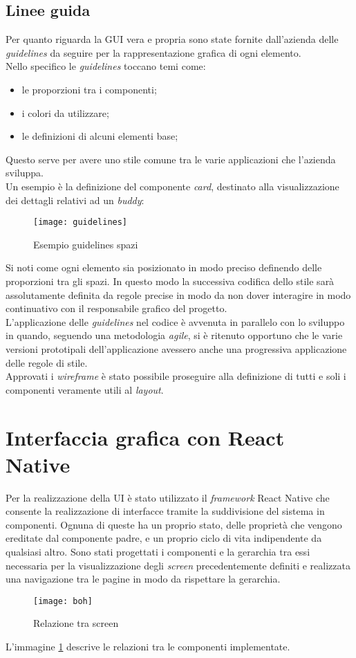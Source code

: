 \subsection{Linee guida}
Per quanto riguarda la GUI vera e propria sono state fornite dall'azienda delle 
\emph{guidelines} da seguire per la rappresentazione grafica di ogni elemento. \\
Nello specifico le \emph{guidelines} toccano temi come:
\begin{itemize}
	\item le proporzioni tra i componenti;
	\item i colori da utilizzare;
	\item le definizioni di alcuni elementi base;
\end{itemize}
Questo serve per avere uno stile comune tra le varie applicazioni che 
l'azienda sviluppa. \\
Un esempio è la definizione del componente \emph{card}, destinato alla 
visualizzazione dei dettagli relativi ad un \emph{buddy}:
\begin{figure}[H] 
	\centering
	\texttt{[image: guidelines]}
	\caption{Esempio guidelines spazi}
\end{figure}
Si noti come ogni elemento sia posizionato in modo preciso definendo delle 
proporzioni tra gli spazi. In questo modo la successiva codifica dello stile sarà 
assolutamente definita da regole precise in modo da non dover interagire in modo 
continuativo con il responsabile grafico del progetto. \\
L'applicazione delle \emph{guidelines} nel codice è avvenuta in parallelo con lo sviluppo 
in quando, seguendo una metodologia \emph{agile}, si è ritenuto opportuno che le varie 
versioni prototipali dell'applicazione avessero anche una progressiva applicazione 
delle regole di stile.\\
Approvati i \emph{wireframe} è stato possibile proseguire alla definizione di tutti 
e soli i componenti veramente utili al \emph{layout}.

\section{Interfaccia grafica con React Native}
Per la realizzazione della UI è stato utilizzato il \emph{framework} React Native che consente la realizzazione di interfacce tramite la suddivisione del sistema in componenti. Ognuna di queste ha un proprio stato, delle proprietà che vengono ereditate dal componente padre, e un proprio ciclo di vita indipendente da qualsiasi altro.
\newline
Sono stati progettati i componenti e la gerarchia tra essi necessaria per la visualizzazione degli \emph{screen} precedentemente definiti e realizzata una navigazione tra le pagine in modo da rispettare la gerarchia.
\begin{figure}[H] 
	\centering
	\texttt{[image: boh]}
	\caption{Relazione tra screen}
	\label{gerarchiaRN}
\end{figure}
L'immagine \ref{gerarchiaRN} descrive le relazioni tra le componenti implementate.
